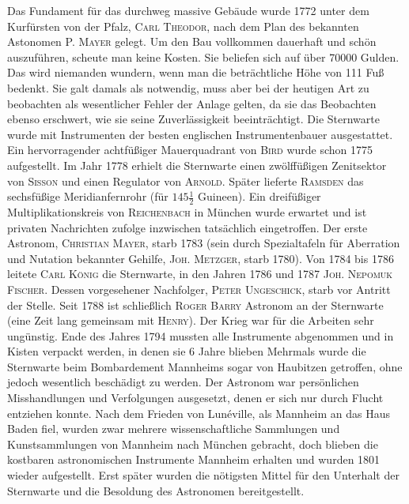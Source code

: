 Das Fundament für das durchweg massive Gebäude wurde 1772 unter dem Kurfürsten von der Pfalz, \textsc{Carl Theodor}, nach dem Plan des bekannten Astonomen P. \textsc{Mayer} gelegt. Um den Bau vollkommen dauerhaft und schön auszuführen, scheute man keine Kosten. Sie beliefen sich auf über 70000 Gulden. Das wird niemanden wundern, wenn man die beträchtliche Höhe von 111 Fuß bedenkt. Sie galt damals als notwendig, muss aber bei der heutigen Art zu beobachten als wesentlicher Fehler der Anlage gelten, da sie das Beobachten ebenso erschwert, wie sie seine Zuverlässigkeit beeinträchtigt. Die Sternwarte wurde mit Instrumenten der besten englischen Instrumentenbauer ausgestattet. Ein hervorragender achtfüßiger Mauerquadrant von \textsc{Bird} wurde schon 1775 aufgestellt. Im Jahr 1778 erhielt die Sternwarte einen zwölffüßigen Zenitsektor von \textsc{Sisson} und einen Regulator von \textsc{Arnold}. Später lieferte \textsc{Ramsden} das sechsfüßige Meridianfernrohr (für $145\tfrac{1}{2}$ Guineen). Ein dreifüßiger Multiplikationskreis von \textsc{Reichenbach} in München wurde erwartet und ist privaten Nachrichten zufolge inzwischen tatsächlich eingetroffen. Der erste Astronom, \textsc{Christian Mayer}, starb 1783 (sein durch Spezialtafeln für Aberration und Nutation bekannter Gehilfe, \textsc{Joh. Metzger}, starb 1780). Von 1784 bis 1786 leitete \textsc{Carl König} die Sternwarte, in den Jahren 1786 und 1787 \textsc{Joh. Nepomuk Fischer}. Dessen vorgesehener Nachfolger, \textsc{Peter Ungeschick}, starb vor Antritt der Stelle. Seit 1788 ist schließlich \textsc{Roger Barry} Astronom an der Sternwarte (eine Zeit lang gemeinsam mit \textsc{Henry}). Der Krieg war für die Arbeiten sehr ungünstig. Ende des Jahres 1794 mussten alle Instrumente abgenommen und in Kisten verpackt werden, in denen sie 6 Jahre blieben Mehrmals wurde die Sternwarte beim Bombardement Mannheims sogar von Haubitzen getroffen, ohne jedoch wesentlich beschädigt zu werden. Der Astronom war persönlichen Misshandlungen und Verfolgungen ausgesetzt, denen er sich nur durch Flucht entziehen konnte. Nach dem Frieden von Lunéville, als Mannheim an das Haus Baden fiel, wurden zwar mehrere wissenschaftliche Sammlungen und Kunstsammlungen von Mannheim nach München gebracht, doch blieben die kostbaren astronomischen Instrumente Mannheim erhalten und wurden 1801 wieder aufgestellt. Erst später wurden die nötigsten Mittel für den Unterhalt der Sternwarte und die Besoldung des Astronomen bereitgestellt.

